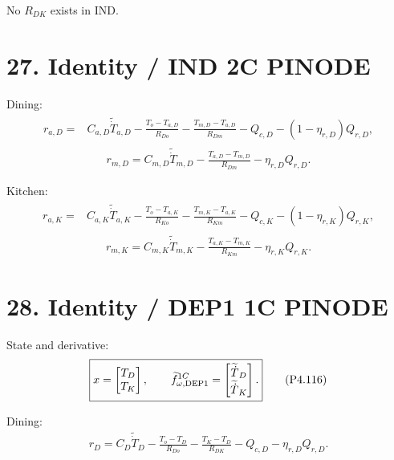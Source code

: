 \documentclass[11pt]{article}
\begin{document}
No \(R_{DK}\) exists in IND.

\section*{27. Identity / IND 2C PINODE}

Dining:
\begin{align}
\boxed{
\begin{aligned}
r_{a,D}
={}&
C_{a,D}\widetilde{\dot T}_{a,D}
-
\frac{T_o-T_{a,D}}{R_{Do}}
-
\frac{T_{m,D}-T_{a,D}}{R_{Dm}}
-
Q_{c,D}
-
(1-\eta_{r,D})Q_{r,D},
\end{aligned}
}
\tag{P4.112}
\end{align}
\begin{align}
\boxed{
r_{m,D}
=
C_{m,D}\widetilde{\dot T}_{m,D}
-
\frac{T_{a,D}-T_{m,D}}{R_{Dm}}
-
\eta_{r,D}Q_{r,D}.
}
\tag{P4.113}
\end{align}

Kitchen:
\begin{align}
\boxed{
\begin{aligned}
r_{a,K}
={}&
C_{a,K}\widetilde{\dot T}_{a,K}
-
\frac{T_o-T_{a,K}}{R_{Ko}}
-
\frac{T_{m,K}-T_{a,K}}{R_{Km}}
-
Q_{c,K}
-
(1-\eta_{r,K})Q_{r,K},
\end{aligned}
}
\tag{P4.114}
\end{align}
\begin{align}
\boxed{
r_{m,K}
=
C_{m,K}\widetilde{\dot T}_{m,K}
-
\frac{T_{a,K}-T_{m,K}}{R_{Km}}
-
\eta_{r,K}Q_{r,K}.
}
\tag{P4.115}
\end{align}

\section*{28. Identity / DEP1 1C PINODE}

State and derivative:
\begin{align}
\boxed{
x=
\begin{bmatrix}
T_D\\T_K
\end{bmatrix},
\qquad
\widetilde f_{\omega,\rm DEP1}^{1C}
=
\begin{bmatrix}
\widetilde{\dot T}_D\\
\widetilde{\dot T}_K
\end{bmatrix}.
}
\tag{P4.116}
\end{align}

Dining:
\begin{align}
\boxed{
r_D
=
C_D\widetilde{\dot T}_D
-
\frac{T_o-T_D}{R_{Do}}
-
\frac{T_K-T_D}{R_{DK}}
-
Q_{c,D}
-
\eta_{r,D}Q_{r,D}.
}
\tag{P4.117}
\end{align}
\end{document}
